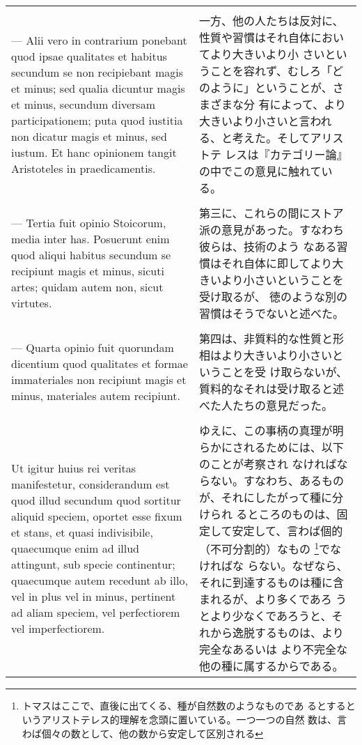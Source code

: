 \documentclass[10pt]{jsarticle} %
\begin{document}
\begin{longtable}{p{21em}p{21em}}
\\\\


--- Alii vero in contrarium ponebant quod
ipsae qualitates et habitus secundum se non recipiebant magis et
minus; sed qualia dicuntur magis et minus, secundum diversam
participationem; puta quod iustitia non dicatur magis et minus, sed
iustum. Et hanc opinionem tangit Aristoteles in praedicamentis.


&

一方、他の人たちは反対に、性質や習慣はそれ自体においてより大きいより小
さいということを容れず、むしろ「どのように」ということが、さまざまな分
有によって、より大きいより小さいと言われる、と考えた。そしてアリストテ
レスは『カテゴリー論』の中でこの意見に触れている。

\\\\


--- Tertia
fuit opinio Stoicorum, media inter has. Posuerunt enim quod aliqui
habitus secundum se recipiunt magis et minus, sicuti artes; quidam
autem non, sicut virtutes. 


&

第三に、これらの間にストア派の意見があった。すなわち彼らは、技術のよう
なある習慣はそれ自体に即してより大きいより小さいということを受け取るが、
徳のような別の習慣はそうでないと述べた。

\\\\



--- Quarta opinio fuit quorundam dicentium quod
qualitates et formae immateriales non recipiunt magis et minus,
materiales autem recipiunt. 


&

第四は、非質料的な性質と形相はより大きいより小さいということを受
け取らないが、質料的なそれは受け取ると述べた人たちの意見だった。

\\\\


Ut igitur huius rei veritas manifestetur, considerandum est quod illud
secundum quod sortitur aliquid speciem, oportet esse fixum et stans,
et quasi indivisibile, quaecumque enim ad illud attingunt, sub specie
continentur; quaecumque autem recedunt ab illo, vel in plus vel in
minus, pertinent ad aliam speciem, vel perfectiorem vel
imperfectiorem.


&

 ゆえに、この事柄の真理が明らかにされるためには、以下のことが考察され
 なければならない。すなわち、あるものが、それにしたがって種に分けられ
 るところのものは、固定して安定して、言わば個的（不可分割的）なもの
 \footnote{トマスはここで、直後に出てくる、種が自然数のようなものであ
 るとするというアリストテレス的理解を念頭に置いている。一つ一つの自然
 数は、言わば個々の数として、他の数から安定して区別される}でなければな
 らない。なぜなら、それに到達するものは種に含まれるが、より多くであろ
 うとより少なくであろうと、それから逸脱するものは、より完全なあるいは
 より不完全な他の種に属するからである。


\end{longtable}
\end{document}
